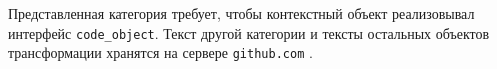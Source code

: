 \documentclass[conference]{IEEEtran} \IEEEoverridecommandlockouts
\begin{document}




Представленная категория требует, чтобы контекстный объект реализовывал интерфейс \texttt{code\_object}. Текст другой категории и тексты остальных объектов трансформации хранятся на сервере \texttt{github.com} \cite{ghsrc}.

\end{document}
